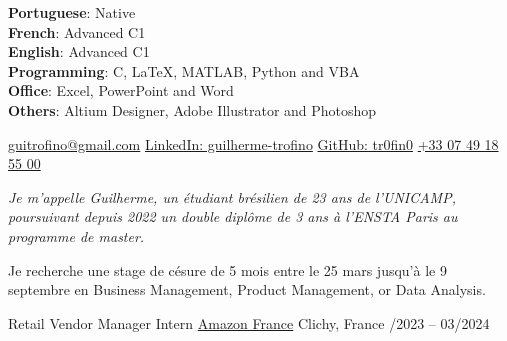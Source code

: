 \documentclass[8pt, a4paper]{article}
\newcommand{\areaofinterest}{Business Management, Product Management, or Data Analysis}
\begin{document}
\vspace{6mm}
\begin{multicols}{2}
    \vspace{2mm}
    \textbf{Portuguese}: Native\\
    \textbf{French}: Advanced C1\\
    \textbf{English}: Advanced C1\\
    \columnbreak
    \vspace{2mm}
    \textbf{Programming}: C, LaTeX, MATLAB, Python and VBA\\
    \textbf{Office}: Excel, PowerPoint and Word\\
    \textbf{Others}: Altium Designer, Adobe Illustrator and Photoshop\\
\end{multicols}



\newpage
{}

\noindent\href{mailto:guitrofino@gmail.com}{guitrofino@gmail.com}
\qquad\href{https://www.linkedin.com/in/guilherme-trofino/}{LinkedIn: guilherme-trofino}
\qquad\href{https://github.com/tr0fin0}{GitHub: tr0fin0}
\qquad\href{tel:+330749185500}{+33 07 49 18 55 00}


\begin{multicols}{2}
\noindent \textit{Je m'appelle Guilherme, un étudiant brésilien de 23 ans de l'UNICAMP, poursuivant depuis 2022 un double diplôme de 3 ans à l'ENSTA Paris au programme de master.}

\columnbreak

\noindent Je recherche une stage de césure de 5 mois entre le 25 mars jusqu'à le 9 septembre en \areaofinterest.
\end{multicols}


\headedsection
    {Retail Vendor Manager Intern}
    {}
    {
        \headedsubsection
        {\href{https://www.aboutamazon.fr/}{Amazon France}}
        {Clichy, France /2023 -- 03/2024}
        {}
    }
\end{document}
